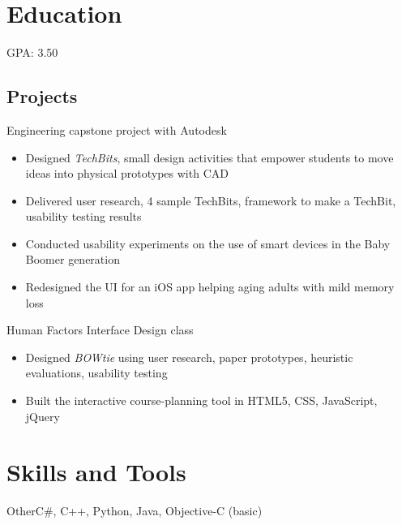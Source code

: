 \documentclass[10pt,a4paper,sans]{moderncv}        %
\begin{document}
\bigskip

\section{Education}
\smallskip
{}
{GPA: 3.50}  %

\bigskip

\subsection{Projects}
{Engineering capstone project with Autodesk}
{{}%
\begin{itemize} 
 	\item Designed \textit{TechBits}, small design activities that empower students to move ideas into physical prototypes with CAD
	 \item Delivered user research, 4 sample TechBits, framework to make a TechBit, usability testing results
\end{itemize}}

{}
{{}%
\begin{itemize} 
 	\item Conducted usability experiments on the use of smart devices in the Baby Boomer generation
	 \item Redesigned the UI for an iOS app helping aging adults with mild memory loss
\end{itemize}}

{Human Factors Interface Design class}
{{}%
\begin{itemize} 
	\item Designed \textit{BOWtie} using user research, paper prototypes, heuristic evaluations, usability testing
	\item Built the interactive course-planning tool in HTML5, CSS, JavaScript, jQuery
\end{itemize}}


\bigskip
\section{Skills and Tools}
\smallskip
{} {Other}{C\#, C++,  Python, Java, Objective-C (basic)}
\end{document}
